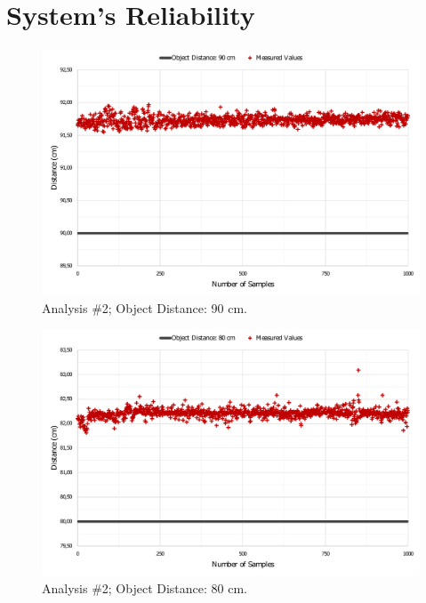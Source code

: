 \clearpage
\section{System's Reliability}\label{appendice1:second}

\begin{figure}[h!]
    \centering
    \includegraphics[scale=0.52]{images/Results/testing_methodology/conf90.pdf}
    \caption{Analysis \#2; Object Distance: 90 cm.}
    \label{fig:conf90}
\end{figure}

\begin{figure}[h!]
    \centering
    \includegraphics[scale=0.52]{images/Results/testing_methodology/conf80.pdf}
    \caption{Analysis \#2; Object Distance: 80 cm.}
    \label{fig:conf80}
\end{figure}

